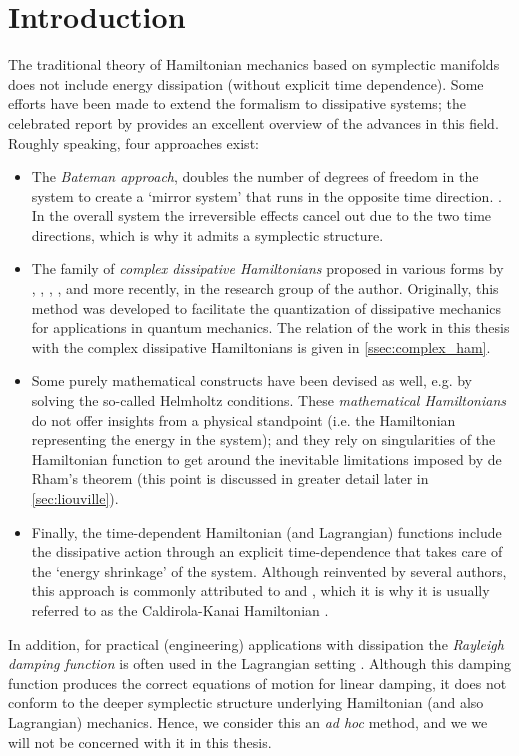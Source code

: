 \section{Introduction}
\label{sec:contact_intro}
The traditional theory of Hamiltonian mechanics based on symplectic manifolds does not include energy dissipation (without explicit time dependence). Some efforts have been made to extend the formalism to dissipative systems; the celebrated report by \citet{Dekker1981} provides an excellent overview of the advances in this field. Roughly speaking, four approaches exist:
\begin{itemize}
    \item The \emph{Bateman approach}, doubles the number of degrees of freedom in the system to create a `mirror system' that runs in the opposite time direction. \cite{Bateman1931}. In the overall system the irreversible effects cancel out due to the two time directions, which is why it admits a symplectic structure.
    \item The family of \emph{complex dissipative Hamiltonians} proposed in various forms by \citet{Bopp1974}, \citet{Dekker1975}, \citet{Dedene1980}, \citet{Rajeev2007}, and more recently, \citet{Hutters2020} in the research group of the author. Originally, this method was developed to facilitate the quantization of dissipative mechanics for applications in quantum mechanics. The relation of the work in this thesis with the complex dissipative Hamiltonians is given in \cref{ssec:complex_ham}.
    \item Some purely mathematical constructs have been devised as well, e.g. by \citet{Havas1957} solving the so-called Helmholtz conditions. These \emph{mathematical Hamiltonians} do not offer insights from a physical standpoint (i.e. the Hamiltonian representing the energy in the system); and they rely on singularities of the Hamiltonian function to get around the inevitable limitations imposed by de Rham's theorem (this point is discussed in greater detail later in \cref{sec:liouville}).
    \item Finally, the time-dependent Hamiltonian (and Lagrangian) functions include the dissipative action through an explicit time-dependence that takes care of the `energy shrinkage' of the system. Although reinvented by several authors, this approach is commonly attributed to \citet{Caldirola1941} and \citet{Kanai1948}, which it is why it is usually referred to as the Caldirola-Kanai Hamiltonian \cite{Schuch1997,Tokieda2021}.
\end{itemize}
In addition, for practical (engineering) applications with dissipation the \emph{Rayleigh damping function} is often used in the Lagrangian setting \cite{Goldstein2011}. Although this damping function produces the correct equations of motion for linear damping, it does not conform to the deeper symplectic structure underlying Hamiltonian (and also Lagrangian) mechanics. Hence, we consider this an \emph{ad hoc} method, and we we will not be concerned with it in this thesis.

